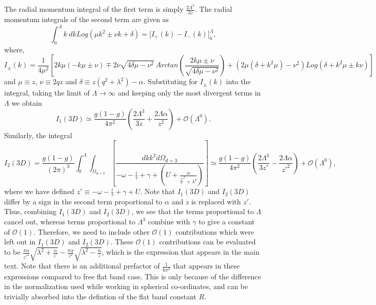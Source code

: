 \documentclass[prl,aps,twocolumn,groupaddress]{revtex4-1}
\begin{document}
The radial momentum integral of the first term is simply $\frac{2 \Lambda^3}{3 z}$. The radial momentum integrals of the second term are given as
\begin{equation}
\int_0^{\Lambda} k~dk Log\left( \mu k^2 \pm \nu k + \delta \right) = \biggl[ I_+(k) -  I_-(k) \biggr]_0^{\Lambda},
\end{equation}
where,
\begin{equation}
I_{\pm}(k) = \frac{1}{4 \mu^2} \left[2 k \mu (- k \mu \pm \nu) \mp 2 \nu \sqrt{4 \delta \mu - \nu^2}~Arctan\left( \frac{2 k \mu \pm \nu}{\sqrt{4 \delta \mu -  \nu^2}}\right) + \left( 2 \mu (\delta + k^2 \mu) - \nu^2\right) Log\left( \delta + k^2 \mu \pm k \nu\right)\right]
\end{equation}
and $\mu\equiv z$, $\nu\equiv 2 q z$ and $\delta \equiv z\left(q^2 + \lambda^2 \right) - \alpha$. Substituting for $I_{\pm}(k)$ into the integral, taking the limit of $\Lambda\rightarrow\infty$ and keeping only the most divergent terms in $\Lambda$ we obtain
\begin{equation}
I_1(3D) \simeq \frac{g(1-g)}{4 \pi^2} \left( \frac{2 \Lambda^3}{3 z} + \frac{2 \Lambda \alpha}{z^2} \right) + \mathscr{O}(\Lambda^0).
\end{equation}
Similarly, the integral 
\begin{equation}
I_2(3D) = \frac{g(1-g)}{\left(2 \pi \right)^3} \int_0^{\Lambda} \int_{\Omega_{d=3}} \left[ \frac{dk k^2 d\Omega_{d=3}}{-\omega - \frac{i}{\tau} + \gamma + \left(U + \frac{\alpha}{ \vec k^2 + \lambda^2}\right)}\right]\simeq  \frac{g(1-g)}{4 \pi^2} \left( \frac{2 \Lambda^3}{3 z'} - \frac{2 \Lambda \alpha}{z'^2} \right) + \mathscr{O}(\Lambda^0),
\end{equation}
where we have defined $z' \equiv -\omega -\frac{i}{\tau} + \gamma + U$. Note that $I_1(3D)$ and $I_2(3D)$ differ by a sign in the second term proportional to $\alpha$ and $z$ is replaced with $z'$. Thus, combining $I_1(3D)$ and $I_2(3D)$, we see that the terms proportional to $\Lambda$ cancel out, whereas terms proportional to $\Lambda^3$ combine with $\gamma$ to give a constant of $\mathscr{O}(1)$. Therefore, we need to include other $\mathscr{O}(1)$ contributions which were left out in $I_1(3D)$ and $I_2(3D)$. These $\mathscr{O}(1)$ contributions can be evaluated to be $\frac{\pi \alpha}{z'^2}\sqrt{\lambda^2 + \frac{\alpha}{z'}} - \frac{\pi \alpha}{z^2}\sqrt{\lambda^2 - \frac{\alpha}{z}}$, which is the expression that appears in the main text. Note that there is an additional prefactor of $\frac{1}{6\pi^2}$ that appears in these expressions compared to free flat band case. This is only because of the difference in the normalization used while working in spherical co-ordinates, and can be trivially absorbed into the defintion of the flat band constant $R$.\\ \newline
\end{document}
